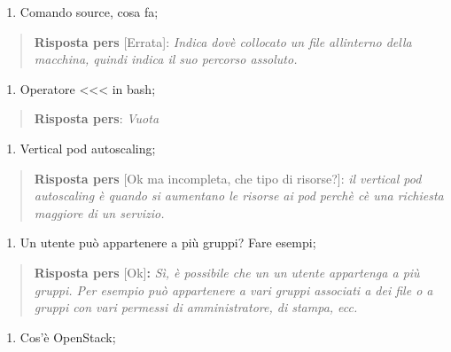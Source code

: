 \begin{enumerate}
\def\labelenumi{\arabic{enumi}.}
\item
  Comando source, cosa fa;
\end{enumerate}

\begin{quote}
\textbf{Risposta pers} {[}Errata{]}: \emph{Indica dov\textquotesingle è
collocato un file all\textquotesingle interno della macchina, quindi
indica il suo percorso assoluto.}
\end{quote}

\begin{enumerate}
\def\labelenumi{\arabic{enumi}.}
\setcounter{enumi}{1}
\item
  Operatore \textless\textless\textless{} in bash;
\end{enumerate}

\begin{quote}
\textbf{Risposta pers}: \emph{Vuota}
\end{quote}

\begin{enumerate}
\def\labelenumi{\arabic{enumi}.}
\setcounter{enumi}{2}
\item
  Vertical pod autoscaling;
\end{enumerate}

\begin{quote}
\textbf{Risposta pers} {[}Ok ma incompleta, che tipo di risorse?{]}:
\emph{il vertical pod autoscaling è quando si aumentano le risorse ai
pod perchè c\textquotesingle è una richiesta maggiore di un servizio.}
\end{quote}

\begin{enumerate}
\def\labelenumi{\arabic{enumi}.}
\setcounter{enumi}{3}
\item
  Un utente può appartenere a più gruppi? Fare esempi;
\end{enumerate}

\begin{quote}
\textbf{Risposta pers} {[}Ok{]}\textbf{:} \emph{Sì, è possibile che un
un utente appartenga a più gruppi. Per esempio può appartenere a vari
gruppi associati a dei file o a gruppi con vari permessi di
amministratore, di stampa, ecc.}
\end{quote}

\begin{enumerate}
\def\labelenumi{\arabic{enumi}.}
\setcounter{enumi}{4}
\item
  Cos'è OpenStack;
\end{enumerate}

